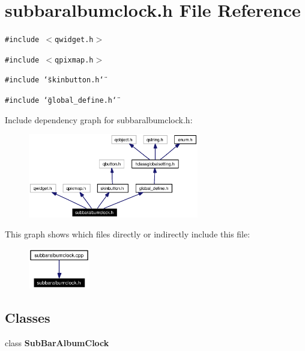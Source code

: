 \section{subbaralbumclock.h File Reference}
\label{subbaralbumclock_8h}


{\tt \#include $<$qwidget.h$>$}\par
{\tt \#include $<$qpixmap.h$>$}\par
{\tt \#include \char`\"{}skinbutton.h\char`\"{}}\par
{\tt \#include \char`\"{}global\_\-define.h\char`\"{}}\par


Include dependency graph for subbaralbumclock.h:\begin{figure}[H]
\begin{center}
\leavevmode
\includegraphics[width=211pt]{subbaralbumclock_8h__incl}
\end{center}
\end{figure}


This graph shows which files directly or indirectly include this file:\begin{figure}[H]
\begin{center}
\leavevmode
\includegraphics[width=76pt]{subbaralbumclock_8h__dep__incl}
\end{center}
\end{figure}
\subsection*{Classes}
\begin{CompactItemize}
\item 
class {\bf Sub\-Bar\-Album\-Clock}
\end{CompactItemize}
